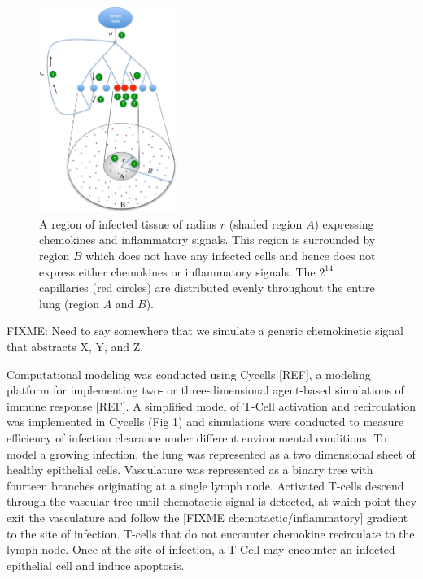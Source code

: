 \documentclass[10pt]{article}
\begin{document}
\begin{figure}[ht!]
\begin{center}
\includegraphics[width=0.4\textwidth]{SystemChart}
\end{center}
\caption{A region of infected tissue of radius $r$ (shaded region $A$) expressing chemokines and inflammatory signals. This region is surrounded by region $B$ which does not have any infected cells and hence does not express either chemokines or inflammatory signals. The $2^{14}$ capillaries (red circles) are distributed evenly throughout the entire lung (region $A$ and $B$).}
\label{fig:systemchart}
\end{figure}


FIXME: Need to say somewhere that we simulate a generic chemokinetic signal that abstracts X, Y, and Z.

Computational modeling was conducted using Cycells [REF], a modeling platform for implementing two- or three-dimensional agent-based simulations of immune response [REF]. A simplified model of T-Cell activation and recirculation was implemented in Cycells (Fig 1) and simulations were conducted to measure efficiency of infection clearance under different environmental conditions. To model a growing infection, the lung was represented as a two dimensional sheet of healthy epithelial cells. Vasculature was represented as a binary tree with fourteen branches originating at a single lymph node. Activated T-cells descend through the vascular tree until chemotactic signal is detected, at which point they exit the vasculature and follow the [FIXME chemotactic/inflammatory] gradient to the site of infection. T-cells that do not encounter chemokine recirculate to the lymph node. Once at the site of infection, a T-Cell may encounter an infected epithelial cell and induce apoptosis.
\end{document}

